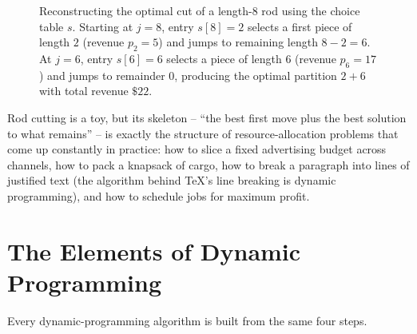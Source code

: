 \begin{figure}[h]
\caption{Reconstructing the optimal cut of a length-$8$ rod using the choice table $s$. Starting at $j=8$, entry $s[8]=2$ selects a first piece of length $2$ (revenue $p_2 = 5$) and jumps to remaining length $8-2=6$. At $j=6$, entry $s[6]=6$ selects a piece of length $6$ (revenue $p_6 = 17$) and jumps to remainder $0$, producing the optimal partition $2+6$ with total revenue $\$22$.}
\label{ch15:fig-cut-rod-reconstruct}
\end{figure}

\begin{aestheticbox}
Rod cutting is a toy, but its skeleton -- ``the best first move plus the best
solution to what remains'' -- is exactly the structure of resource-allocation
problems that come up constantly in practice: how to slice a fixed advertising budget across
channels, how to pack a knapsack of cargo, how to break a paragraph into lines
of justified text (the algorithm behind \TeX's line breaking is
dynamic programming), and how to schedule jobs for maximum profit.
\end{aestheticbox}

\section{The Elements of Dynamic Programming}
\label{ch15:elements}

Every dynamic-programming algorithm is built from the
same four steps.

